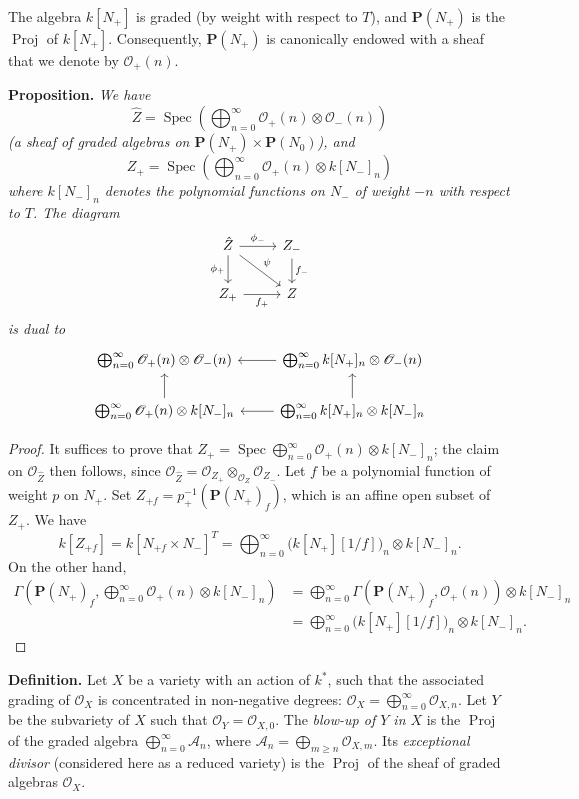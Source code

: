 \documentclass{article}
\newenvironment{itenv}[1]
  {\phantomsection\par\medskip\noindent\textbf{#1.}\itshape}
  {\medskip}
\newenvironment{rmenv}[1]
  {\phantomsection\par\medskip\noindent\textbf{#1.}\rmfamily}
  {\medskip}
\newcommand{\scr}[1]{{\mathscr{#1}}}
\newcommand{\PP}{\mathbf{P}}
\DeclareMathOperator{\Spec}{Spec}
\DeclareMathOperator{\Proj}{Proj}
\renewcommand{\geq}{\geqslant}
\newcommand{\oldpage}[1]{\marginpar{\footnotesize$\Big\vert$ \textit{p.~#1}}}
\begin{document}
The algebra $k[N_+]$ is graded (by weight with respect to $T$), and $\PP(N_+)$ is the $\Proj$ of $k[N_+]$.
Consequently, $\PP(N_+)$ is canonically endowed with a sheaf that we denote by $\scr{O}_+(n)$.

\begin{itenv}{Proposition}
  We have
  \[
    \hat{Z} = \Spec \left( \bigoplus_{n=0}^\infty \scr{O}_+(n)\otimes\scr{O}_-(n) \right)
  \]
  (a sheaf of graded algebras on $\PP(N_+)\times\PP(N_0)$), and
  \[
    Z_+ = \Spec \left( \bigoplus_{n=0}^\infty \scr{O}_+(n)\otimes k[N_-]_n \right)
  \]
  where $k[N_-]_n$ denotes the polynomial functions on $N_-$ of weight $-n$ with respect to $T$.
  The diagram
  \[
    \begin{tikzcd}
      \hat{Z} \rar["\phi_-"] \dar[swap,"\phi_+"] \drar["\psi"]
      & Z_- \dar["f_-"]
    \\Z_+ \rar[swap,"f_+"]
      & Z
    \end{tikzcd}
  \]
\oldpage{519}
  is dual to
  \[
    \begin{tikzcd}
      \bigoplus_{n=0}^\infty\scr{O}_+(n)\otimes\scr{O}_-(n)
      & \bigoplus_{n=0}^\infty k[N_+]_n\otimes\scr{O}_-(n) \lar
    \\\bigoplus_{n=0}^\infty\scr{O}_+(n)\otimes k[N_-]_n \uar
      & \bigoplus_{n=0}^\infty k[N_+]_n\otimes k[N_-]_n \uar \lar
    \end{tikzcd}
  \]
\end{itenv}

\begin{proof}
  It suffices to prove that $Z_+=\Spec\bigoplus_{n=0}^\infty\scr{O}_+(n)\otimes k[N_-]_n$;
  the claim on $\scr{O}_{\hat{Z}}$ then follows, since $\scr{O}_{\hat{Z}}=\scr{O}_{Z_+}\otimes_{\scr{O}_Z}\scr{O}_{Z_-}$.
  Let $f$ be a polynomial function of weight $p$ on $N_+$.
  Set $Z_{+f}=p_+^{-1}(\PP(N_+)_f)$, which is an affine open subset of $Z_+$.
  We have
  \[
    k[Z_{+f}]
    = k[N_{+f}\times N_-]^T
    = \bigoplus_{n=0}^\infty\big(k[N_+][1/f]\big)_n\otimes k[N_-]_n.
  \]
  On the other hand,
  \[
    \begin{aligned}
      \Gamma\left(\PP(N_+)_f, \bigoplus_{n=0}^\infty\scr{O}_+(n)\otimes k[N_-]_n\right)
      &= \bigoplus_{n=0}^\infty\Gamma\left(\PP(N_+)_f,\scr{O}_+(n)\right)\otimes k[N_-]_n
    \\&= \bigoplus_{n=0}^\infty\big(k[N_+][1/f]\big)_n\otimes k[N_-]_n.
    \end{aligned}
  \]
\end{proof}

\begin{rmenv}{Definition}
  Let $X$ be a variety with an action of $k^*$, such that the associated grading of $\scr{O}_X$ is concentrated in non-negative degrees: $\scr{O}_X=\bigoplus_{n=0}^\infty\scr{O}_{X,n}$.
  Let $Y$ be the subvariety of $X$ such that $\scr{O}_Y=\scr{O}_{X,0}$.
  The \emph{blow-up of $Y$ in $X$} is the $\Proj$ of the graded algebra $\bigoplus_{n=0}^\infty\mathcal{A}_n$, where $\mathcal{A}_n=\bigoplus_{m\geq n}\scr{O}_{X,m}$.
  Its \emph{exceptional divisor} (considered here as a reduced variety) is the $\Proj$ of the sheaf of graded algebras $\scr{O}_X$.
\end{rmenv}
\end{document}
